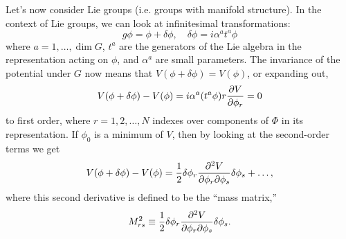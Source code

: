Let's now consider Lie groups (i.e. groups with manifold structure). In the context of Lie groups, we can look at infinitesimal transformations:
\begin{equation}
    g\phi=\phi+\delta \phi, \quad \delta \phi = i\alpha^a t^a \phi
\end{equation}
where $a=1,\ldots, \dim G$, $t^a$ are the generators of the Lie algebra in the representation acting on $\phi$, and $\alpha^a$ are small parameters. The invariance of the potential under $G$ now means that $V(\phi+\delta \phi)=V(\phi)$, or expanding out,
\begin{equation}
    V(\phi+\delta \phi)-V(\phi)= i\alpha^a (t^a \phi)r \P{V}{\phi_r}=0
\end{equation}
to first order, where $r=1,2,\ldots, N$ indexes over components of $\Phi$ in its representation. If $\phi_0$ is a minimum of $V$, then by looking at the second-order terms we get
\begin{equation}
    V(\phi+\delta \phi)-V(\phi)= \frac{1}{2} \delta \phi_r \frac{\p^2 V}{\p \phi_r \p \phi_s}\delta \phi_s+\ldots,
\end{equation}
where this second derivative is defined to be the ``mass matrix,''
\begin{equation}
    M_{rs}^2 \equiv \frac{1}{2} \delta \phi_r \frac{\p^2 V}{\p \phi_r \p \phi_s}\delta \phi_s.
\end{equation}